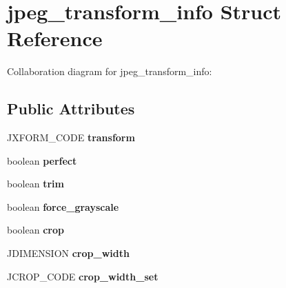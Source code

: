 \hypertarget{structjpeg__transform__info}{\section{jpeg\+\_\+transform\+\_\+info Struct Reference}
\label{structjpeg__transform__info}
}


Collaboration diagram for jpeg\+\_\+transform\+\_\+info\+:
\subsection*{Public Attributes}
\begin{DoxyCompactItemize}
\item 
\hypertarget{structjpeg__transform__info_aa3227394d9b01bae8543faf79e9c5fe8}{J\+X\+F\+O\+R\+M\+\_\+\+C\+O\+D\+E {\bfseries transform}}\label{structjpeg__transform__info_aa3227394d9b01bae8543faf79e9c5fe8}

\item 
\hypertarget{structjpeg__transform__info_a6cefe762b48d689b0b805dd5c3be75fd}{boolean {\bfseries perfect}}\label{structjpeg__transform__info_a6cefe762b48d689b0b805dd5c3be75fd}

\item 
\hypertarget{structjpeg__transform__info_a4f1f979322463d2c02a307047f0cf6b7}{boolean {\bfseries trim}}\label{structjpeg__transform__info_a4f1f979322463d2c02a307047f0cf6b7}

\item 
\hypertarget{structjpeg__transform__info_a26d925edb18e0095056b38312fb86e53}{boolean {\bfseries force\+\_\+grayscale}}\label{structjpeg__transform__info_a26d925edb18e0095056b38312fb86e53}

\item 
\hypertarget{structjpeg__transform__info_a9c2edc10e30220708a48c93422841dc4}{boolean {\bfseries crop}}\label{structjpeg__transform__info_a9c2edc10e30220708a48c93422841dc4}

\item 
\hypertarget{structjpeg__transform__info_aa7669467cf9562283cfc92df23798035}{J\+D\+I\+M\+E\+N\+S\+I\+O\+N {\bfseries crop\+\_\+width}}\label{structjpeg__transform__info_aa7669467cf9562283cfc92df23798035}

\item 
\hypertarget{structjpeg__transform__info_a8f5206aab70a3ff0b0acc94cb8692b4c}{J\+C\+R\+O\+P\+\_\+\+C\+O\+D\+E {\bfseries crop\+\_\+width\+\_\+set}}\label{structjpeg__transform__info_a8f5206aab70a3ff0b0acc94cb8692b4c}


\end{DoxyCompactItemize}
